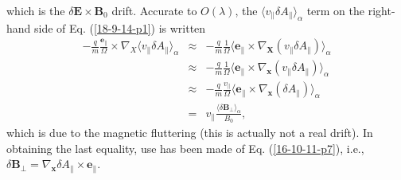 \documentclass{article}
\begin{document}
which is the $\delta \mathbf{E} \times \mathbf{B}_0$ drift. Accurate to $O
(\lambda)$, the $\langle v_{\parallel} \delta A_{\parallel} \rangle_{\alpha}$
term on the right-hand side of Eq. (\ref{18-9-14-p1}) is written
\begin{eqnarray}
  - \frac{q}{m}  \frac{\mathbf{e}_{\parallel}}{\Omega} \times \nabla_X \langle
  v_{\parallel} \delta A_{\parallel} \rangle_{\alpha} & \approx & -
  \frac{q}{m} \frac{1}{\Omega} \langle \mathbf{e}_{\parallel} \times
  \nabla_{\mathbf{X}} (v_{\parallel} \delta A_{\parallel}) \rangle_{\alpha}
  \nonumber\\
  & \approx & - \frac{q}{m}  \frac{1}{\Omega} \langle \mathbf{e}_{\parallel}
  \times \nabla_{\mathbf{x}} (v_{\parallel} \delta A_{\parallel})
  \rangle_{\alpha} \nonumber\\
  & \approx & - \frac{q}{m} \frac{v_{\parallel}}{\Omega} \langle
  \mathbf{e}_{\parallel} \times \nabla_{\mathbf{x}} (\delta A_{\parallel})
  \rangle_{\alpha} \nonumber\\
  & = & v_{\parallel} \frac{\langle \delta \mathbf{B}_{\perp}
  \rangle_{\alpha}}{B_0},  \label{16-10-11-p10}
\end{eqnarray}
which is due to the magnetic fluttering (this is actually not a real drift).
In obtaining the last equality, use has been made of Eq. (\ref{16-10-11-p7}),
i.e., $\delta \mathbf{B}_{\perp} = \nabla_{\mathbf{x}} \delta A_{\parallel}
\times \mathbf{e}_{\parallel}$.
\end{document}
